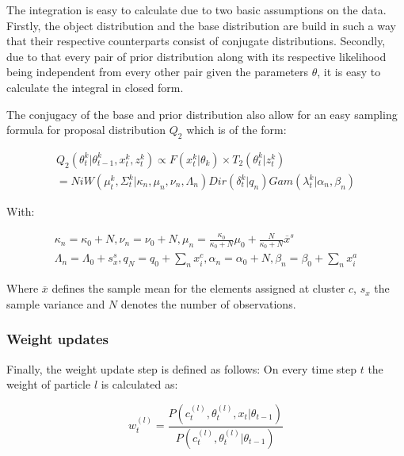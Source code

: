 \documentclass[twoside,hidelinks]{article}
\begin{document}
The integration is easy to calculate due to two basic assumptions on the data. Firstly, the object distribution and the base distribution are build in such a way that their respective counterparts consist of conjugate distributions. Secondly, due to that every pair of prior distribution along with its respective likelihood being independent from every other pair given the parameters $\theta$, it is easy to calculate the integral in closed form.

The conjugacy of the base and prior distribution also allow for an easy sampling formula for proposal distribution $Q_2$ which is of the form: 

\begin{equation} \label{Q_2}
\begin{split}
Q_2(\theta_t^k | \theta_{t-1}^k , x_t^k, z_t^k) \propto F( x_t^k | \theta_k) \times T_2(\theta_t^k | z_t^k) \\
= NiW( \mu_t^k, \Sigma_t^k | \kappa_n, \mu_n, \nu_n, \Lambda_n ) Dir(\delta_t^k | q_n) Gam(\lambda_t^k | \alpha_n, \beta_n)
\end{split}
\end{equation}

With:

\begin{equation} \label{udpates}
\begin{split}
\kappa_n = \kappa_0 + N ,
\nu_n = \nu_0 + N ,
\mu_n = \frac{\kappa_0}{\kappa_0 + N} \mu_0 +  \frac{N}{\kappa_0 + N} \overline{x}^s\\
\Lambda_n = \Lambda_0 + s_{x}^s,
q_N = q_0 +  \sum_n x_i^c,
\alpha_n = \alpha_0 +  N,
\beta_n = \beta_0 +  \sum_n x_i^a
\end{split}
\end{equation}


Where $\overline{x}$ defines the sample mean for the elements assigned at cluster $c$, $s_{x}$ the sample variance and $N$ denotes the number of observations\cite{conjugate}.

\subsubsection{Weight updates}

Finally, the weight update step is defined as follows: On every time step $t$ the weight of particle $l$ is calculated as:

\begin{equation}
w_t^{(l)} = \frac {P(c_t^{(l)} , \theta_t^{(l)}, x_t| 	\theta_{t-1} )}{P(c_t^{(l)} , \theta_t^{(l)}| 	\theta_{t-1} )}
\end{equation}
\end{document}
